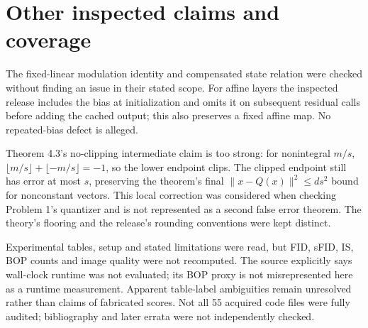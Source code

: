 \documentclass[10pt]{article}
\begin{document}
\section*{Other inspected claims and coverage}
The fixed-linear modulation identity and compensated state relation were checked without finding an issue in their stated scope. For affine layers the inspected release includes the bias at initialization and omits it on subsequent residual calls before adding the cached output; this also preserves a fixed affine map. No repeated-bias defect is alleged.\par
Theorem 4.3’s no-clipping intermediate claim is too strong: for nonintegral \(m/s\), \(\lfloor m/s\rfloor+\lfloor-m/s\rfloor=-1\), so the lower endpoint clips. The clipped endpoint still has error at most \(s\), preserving the theorem’s final \(\|x-Q(x)\|^2\le ds^2\) bound for nonconstant vectors. This local correction was considered when checking Problem 1’s quantizer and is not represented as a second false error theorem. The theory’s flooring and the release’s rounding conventions were kept distinct.\par
Experimental tables, setup and stated limitations were read, but FID, sFID, IS, BOP counts and image quality were not recomputed. The source explicitly says wall-clock runtime was not evaluated; its BOP proxy is not misrepresented here as a runtime measurement. Apparent table-label ambiguities remain unresolved rather than claims of fabricated scores. Not all 55 acquired code files were fully audited; bibliography and later errata were not independently checked.\par
\end{document}
